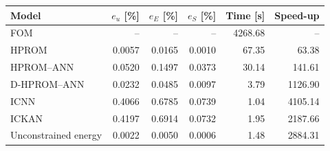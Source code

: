\begin{tabular}{lrrrrr}
\toprule
Model & $e_u$ [\%] & $e_E$ [\%] & $e_S$ [\%] & Time [s] & Speed-up \\
\midrule
FOM & -- & -- & -- & 4268.68 & -- \\
HPROM & 0.0057 & 0.0165 & 0.0010 & 67.35 & 63.38 \\
HPROM--ANN & 0.0520 & 0.1497 & 0.0373 & 30.14 & 141.61 \\
D-HPROM--ANN & 0.0232 & 0.0485 & 0.0097 & 3.79 & 1126.90 \\
ICNN & 0.4066 & 0.6785 & 0.0739 & 1.04 & 4105.14 \\
ICKAN & 0.4197 & 0.6914 & 0.0732 & 1.95 & 2187.66 \\
Unconstrained energy & 0.0022 & 0.0050 & 0.0006 & 1.48 & 2884.31 \\
\bottomrule
\end{tabular}
